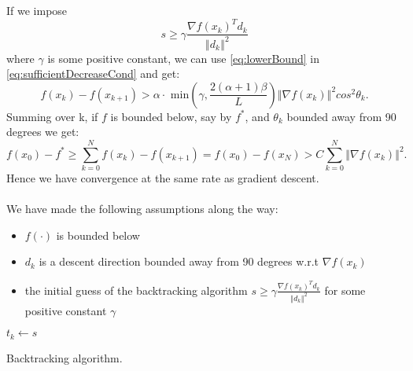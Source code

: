 \documentclass{article}
\newcommand{\norm}[1]{\left\Vert #1 \right\Vert}
\begin{document}
If we impose
\begin{equation}
s\geq\gamma\frac{\nabla f(x_k)^Td_k}{\norm{d_k}^2}
\end{equation}
where $\gamma$ is some positive constant, we can use \ref{eq:lowerBound} in \ref{eq:sufficientDecreaseCond} and get:
\begin{equation}
f(x_k) - f(x_{k+1}) >\alpha\cdot \text{ min}\left(\gamma,\frac{2(\alpha+1)\beta}{L}\right ) \norm{\nabla f(x_k)}^2 cos^2\theta_k.
\end{equation}
Summing over k, if $f$ is bounded below, say by $f^*$, and $\theta_k$ bounded away from 90 degrees we get:
\begin{equation}
	f(x_0)-f^* \geq \sum_{k=0}^N f(x_k) - f(x_{k+1})  = f(x_0)-f(x_N) > C\sum_{k=0}^N\norm{\nabla f(x_k)}^2.
\end{equation}
Hence we have convergence at the same rate as gradient descent.\\\\
We have made the following assumptions along the way:
\begin{itemize}
	\item $f(\cdot)$ is bounded below
	\item $d_k$ is a descent direction bounded away from 90 degrees w.r.t $\nabla f(x_k)$
	\item the initial guess of the backtracking algorithm $s\geq \gamma \frac{\nabla f(x_k)^Td_k}{\norm{d_k}^2}$ for some positive constant $\gamma$
\end{itemize}


\begin{algorithm}[!h]
	$t_k\gets s$\\
	\caption{Backtracking algorithm.}
	\label{algo:backtracking}
\end{algorithm}
 
\end{document}
